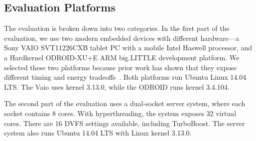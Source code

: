 \subsection{Evaluation Platforms}

The evaluation is broken down into two categories.
In the first part of the evaluation, we use two modern embedded devices with different hardware---a Sony VAIO SVT11226CXB tablet PC with a mobile Intel Haswell processor, and a Hardkernel ODROID-XU+E ARM big.LITTLE development platform.
We selected these two platforms because prior work has shown that they expose different timing and energy tradeoffs~\cite{Imes2014}.
Both platforms run Ubuntu Linux 14.04 LTS.
The Vaio uses kernel 3.13.0, while the ODROID runs kernel 3.4.104.


The second part of the evaluation uses a dual-socket server system, where each socket contains 8 cores.
With hyperthreading, the system exposes 32 virtual cores.
There are 16 DVFS settings available, including TurboBoost.
The server system also runs Ubuntu 14.04 LTS with Linux kernel 3.13.0.

